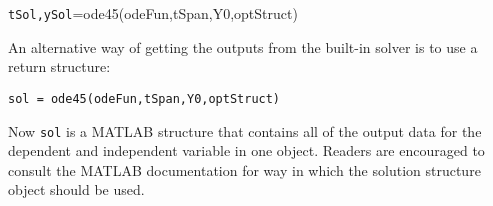 \noindent\parbox{\textwidth}{
\centering
\lstinline[style=myMatlab]{tSol,ySol}=ode45(odeFun,tSpan,Y0,optStruct)

}

\vspace{0.25cm}

\newthought An alternative way of getting the outputs from the built-in solver is to use a return structure:

\vspace{0.25cm}

\noindent\parbox{\textwidth}{
\centering
\lstinline[style=myMatlab]{sol = ode45(odeFun,tSpan,Y0,optStruct)}
}

\vspace{0.25cm}

\noindent Now \lstinline[style=myMatlab]{sol} is a MATLAB structure that contains all of the output data for the dependent and independent variable in one object.  Readers are encouraged to consult the MATLAB documentation for way in which the solution structure object should be used.
